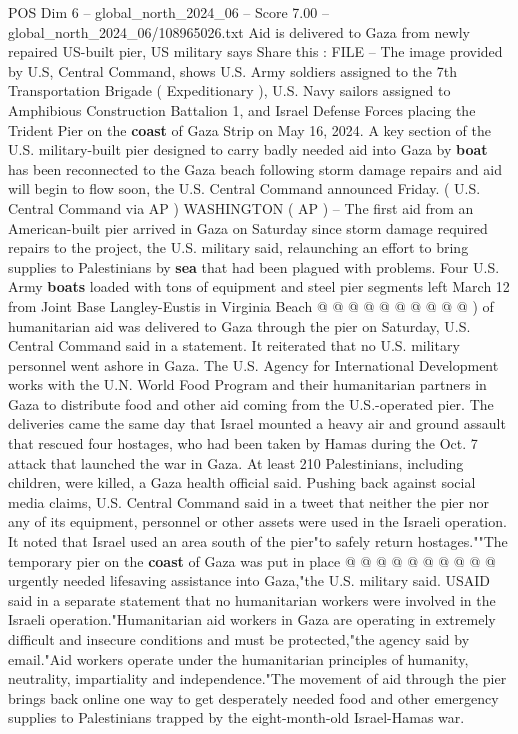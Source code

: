 \begin{textsample}{POS Dim 6 – global\_north\_2024\_06 – Score 7.00 – global\_north\_2024\_06/108965026.txt}  \label{ex:f6_pos_142}
Aid is delivered to Gaza from newly repaired US-built pier, US military says Share this : FILE -- The image provided by U.S, Central Command, shows U.S.
Army soldiers assigned to the 7th Transportation Brigade ( Expeditionary ), U.S.
Navy sailors assigned to Amphibious Construction Battalion 1, and Israel Defense Forces placing the Trident Pier on the \textbf{coast} of Gaza Strip on May 16, 2024.
A key section of the U.S. military-built pier designed to carry badly needed aid into Gaza by \textbf{boat} has been reconnected to the Gaza beach following storm damage repairs and aid will begin to flow soon, the U.S.
Central Command announced Friday. ( U.S.
Central Command via AP ) WASHINGTON ( AP ) -- The first aid from an American-built pier arrived in Gaza on Saturday since storm damage required repairs to the project, the U.S. military said, relaunching an effort to bring supplies to Palestinians by \textbf{sea} that had been plagued with problems.
Four U.S.
Army \textbf{boats} loaded with tons of equipment and steel pier segments left March 12 from Joint Base Langley-Eustis in Virginia Beach @ @ @ @ @ @ @ @ @ @ ) of humanitarian aid was delivered to Gaza through the pier on Saturday, U.S.
Central Command said in a statement.
It reiterated that no U.S. military personnel went ashore in Gaza.
The U.S.
Agency for International Development works with the U.N.
World Food Program and their humanitarian partners in Gaza to distribute food and other aid coming from the U.S.-operated pier.
The deliveries came the same day that Israel mounted a heavy air and ground assault that rescued four hostages, who had been taken by Hamas during the Oct. 7 attack that launched the war in Gaza.
At least 210 Palestinians, including children, were killed, a Gaza health official said.
Pushing back against social media claims, U.S.
Central Command said in a tweet that neither the pier nor any of its equipment, personnel or other assets were used in the Israeli operation.
It noted that Israel used an area south of the pier"to safely return hostages.""The temporary pier on the \textbf{coast} of Gaza was put in place @ @ @ @ @ @ @ @ @ @ urgently needed lifesaving assistance into Gaza,"the U.S. military said.
USAID said in a separate statement that no humanitarian workers were involved in the Israeli operation."Humanitarian aid workers in Gaza are operating in extremely difficult and insecure conditions and must be protected,"the agency said by email."Aid workers operate under the humanitarian principles of humanity, neutrality, impartiality and independence."The movement of aid through the pier brings back online one way to get desperately needed food and other emergency supplies to Palestinians trapped by the eight-month-old Israel-Hamas war.

\end{textsample}
